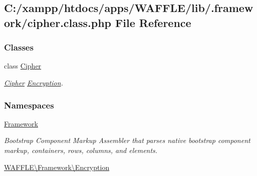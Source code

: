 \hypertarget{cipher_8class_8php}{}\subsection{C\+:/xampp/htdocs/apps/\+W\+A\+F\+F\+L\+E/lib/.framework/cipher.class.\+php File Reference}
\label{cipher_8class_8php}
\subsubsection*{Classes}
\begin{DoxyCompactItemize}
\item 
class \hyperlink{class_w_a_f_f_l_e_1_1_framework_1_1_encryption_1_1_cipher}{Cipher}
\begin{DoxyCompactList}\small\item\em \hyperlink{class_w_a_f_f_l_e_1_1_framework_1_1_encryption_1_1_cipher}{Cipher} \hyperlink{namespace_w_a_f_f_l_e_1_1_framework_1_1_encryption}{Encryption}. \end{DoxyCompactList}\end{DoxyCompactItemize}
\subsubsection*{Namespaces}
\begin{DoxyCompactItemize}
\item 
 \hyperlink{namespace_framework}{Framework}
\begin{DoxyCompactList}\small\item\em Bootstrap Component Markup Assembler that parses native bootstrap component markup, containers, rows, columns, and elements. \end{DoxyCompactList}\item 
 \hyperlink{namespace_w_a_f_f_l_e_1_1_framework_1_1_encryption}{W\+A\+F\+F\+L\+E\textbackslash{}\+Framework\textbackslash{}\+Encryption}
\end{DoxyCompactItemize}
